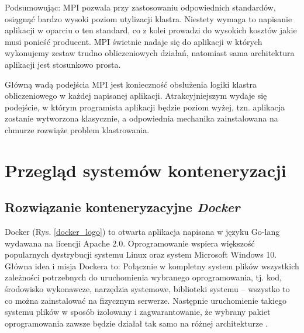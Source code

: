 \documentclass[10pt,a4paper,titlepage,twoside]{report}
\begin{document}
Podsumowując: MPI pozwala przy zastosowaniu odpowiednich standardów, osiągnąć bardzo wysoki poziom utylizacji klastra. Niestety wymaga to napisanie aplikacji w oparciu o ten standard, co z kolei prowadzi do wysokich kosztów jakie musi ponieść producent. MPI świetnie nadaje się do aplikacji w których wykonujemy zestaw trudno obliczeniowych działań, natomiast sama architektura aplikacji jest stosunkowo prosta.

Główną wadą podejścia MPI jest konieczność obsłużenia logiki klastra obliczeniowego w każdej napisanej aplikacji. Atrakcyjniejszym wydaje się podejście, w którym programista aplikacji będzie poziom wyżej, tzn. aplikacja zostanie wytworzona klasycznie, a odpowiednia mechanika zainstalowana na chmurze rozwiąże problem klastrowania.

\section{Przegląd systemów konteneryzacji}
\subsection{Rozwiązanie konteneryzacyjne \textit{Docker}}
\indent \indent Docker (Rys. \ref{docker_logo}) to otwarta aplikacja napisana w języku Go-lang wydawana na licencji Apache 2.0. Oprogramowanie wspiera większość popularnych dystrybucji systemu Linux oraz system Microsoft Windows 10. Główna idea i misja Dockera to: Połącznie w kompletny system plików wszystkich zależności potrzebnych do uruchomienia wybranego oprogramowania, tj. kod, środowisko wykonawcze, narzędzia systemowe, biblioteki systemu – wszystko to co można zainstalować na fizycznym serwerze. Następnie uruchomienie takiego systemu plików w sposób izolowany i zagwarantowanie, że wybrany pakiet oprogramowania zawsze będzie działał tak samo na różnej architekturze \cite{ad27}.
\end{document}
